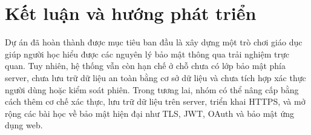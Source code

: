 \section{Kết luận và hướng phát triển}

Dự án đã hoàn thành được mục tiêu ban đầu là xây dựng một trò chơi giáo dục giúp người học hiểu được các nguyên lý bảo mật thông qua trải nghiệm trực quan. Tuy nhiên, hệ thống vẫn còn hạn chế ở chỗ chưa có lớp bảo mật phía server, chưa lưu trữ dữ liệu an toàn bằng cơ sở dữ liệu và chưa tích hợp xác thực người dùng hoặc kiểm soát phiên. Trong tương lai, nhóm có thể nâng cấp bằng cách thêm cơ chế xác thực, lưu trữ dữ liệu trên server, triển khai HTTPS, và mở rộng các bài học về bảo mật hiện đại như TLS, JWT, OAuth và bảo mật ứng dụng web.
